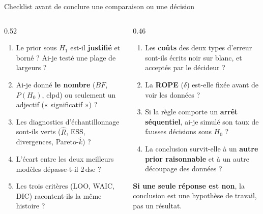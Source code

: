 \begin{frame}{Checklist avant de conclure une comparaison ou une décision}
\begin{abox}
\begin{columns}[t]
\begin{column}{0.52\textwidth}
\begin{enumerate}
  \item Le prior sous $H_1$ est-il \textbf{justifié} et borné ? Ai-je testé
        une plage de largeurs ?
  \item Ai-je donné \textbf{le nombre} ($BF$, $P(H_0)$, elpd) ou seulement
        un adjectif (« significatif ») ?
  \item Les diagnostics d'échantillonnage sont-ils verts ($\hat R$,
        ESS, divergences, Pareto-$\hat k$) ?
  \item L'écart entre les deux meilleurs modèles dépasse-t-il
        $2\,\text{dse}$ ?
  \item Les trois critères (LOO, WAIC, DIC) racontent-ils la même histoire ?
\end{enumerate}
\end{column}
\begin{column}{0.46\textwidth}
\begin{enumerate}
  \item[6.] Les \textbf{coûts} des deux types d'erreur sont-ils écrits
        noir sur blanc, et acceptés par le décideur ?
  \item[7.] La \textbf{ROPE} ($\delta$) est-elle fixée avant de voir les
        données ?
  \item[8.] Si la règle comporte un \textbf{arrêt séquentiel}, ai-je simulé
        son taux de fausses décisions sous $H_0$ ?
  \item[9.] La conclusion survit-elle à un \textbf{autre prior raisonnable}
        et à un autre découpage des données ?
\end{enumerate}
\vspace{2mm}
\textbf{Si une seule réponse est non}, la conclusion est une hypothèse de
travail, pas un résultat.
\end{column}
\end{columns}
\end{abox}
\end{frame}

